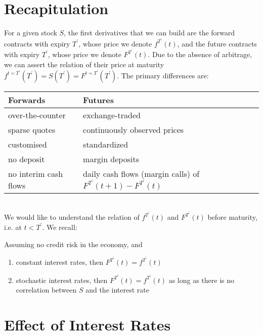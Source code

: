 \documentclass[11pt]{article}
\date{Lecture 3 (22 Jan. 2013)}
\begin{document}
{\small \maketitle}

\section{Recapitulation}
For a given stock $S$, the first derivatives that we can build are the forward contracts with expiry $T^\prime$, whose price we denote $f^{T^\prime}(t)$, and the future contracts with expiry $T^\prime$, whose price we denote $F^{T^\prime}(t)$. Due to the absence of arbitrage, we can assert the relation of their price at maturity $f^{t=T^\prime}(T^\prime) = S(T^\prime) = F^{t=T^\prime}(T^\prime)$. The primary differences are: \\

\begin{tabular}{l | l}
Forwards & Futures \\
\hline
over-the-counter & exchange-traded \\
sparse quotes & continuously observed prices \\
customised & standardized \\
no deposit & margin deposits \\
no interim cash flows & daily cash flows (margin calls) of $F^{T^\prime}(t + 1) - F^{T^\prime}(t)$ \\
\end{tabular} \\

We would like to understand the relation of $f^{T^\prime}(t)$ and $F^{T^\prime}(t)$ before maturity, i.e. at $t < T^\prime$. We recall:

\begin{theorem} Assuming no credit risk in the economy, and
\begin{enumerate}
\item constant interest rates, then $F^{T^\prime}(t) = f^{T^\prime}(t)$
\item stochastic interest rates, then $F^{T^\prime}(t) = f^{T^\prime}(t)$ as long as there is no correlation between $S$ and the interest rate
\end{enumerate}
\end{theorem}

\section{Effect of Interest Rates}
\end{document}
